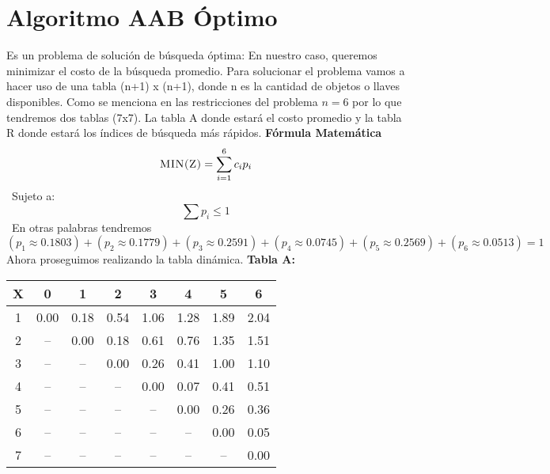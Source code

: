 \documentclass[10pt,letterpaper]{article}
\begin{document}
\section{Algoritmo AAB Óptimo} 
        Es un problema de solución de búsqueda óptima:  
        En nuestro caso, queremos minimizar el costo de la búsqueda promedio. 
        Para solucionar el problema vamos a hacer uso de una tabla (n+1) x (n+1), donde n es la cantidad 
        de objetos o llaves disponibles. 
        Como se menciona en las restricciones del problema $n = 6$ por lo que tendremos 
        dos tablas (7x7). La tabla A donde estará el costo promedio y la tabla R donde estará 
        los índices de búsqueda más rápidos. \newline \newline \newline 
        \textbf{\Large Fórmula Matemática} 
        \[ \textsc{\normalsize MIN(Z)}\\[0.5cm] = \sum_{i=1}^{6}c_{i}p_{i} \] 
        \ Sujeto a:  
        \[ \sum p_{i} \leq 1 \] 
        \ En otras palabras tendremos 
\[ (p_{1} \approx 0.1803)+(p_{2} \approx 0.1779)+(p_{3} \approx 0.2591)+(p_{4} \approx 0.0745)+(p_{5} \approx 0.2569)+(p_{6} \approx 0.0513) = 1 \]
\newline Ahora proseguimos realizando la tabla dinámica.
\newline \newline \newline \textbf{Tabla A: }
\begin{center}
\begin{tabu} to 1.0\textwidth { | c | c | c | c | c | c | c | c | }
\hline
{}\color{black}\textbf{X} & \color{black}\textbf{0} & \color{black}\textbf{1} & \color{black}\textbf{2} & \color{black}\textbf{3} & \color{black}\textbf{4} & \color{black}\textbf{5} & \color{black}\textbf{6} \\ 
\hline
{}\color{black}1 & 0.00 & 0.18 & 0.54 & 1.06 & 1.28 & 1.89 & 2.04 \\ 
\hline
{}\color{black}2 &  --  & 0.00 & 0.18 & 0.61 & 0.76 & 1.35 & 1.51 \\ 
\hline
{}\color{black}3 &  --  &  --  & 0.00 & 0.26 & 0.41 & 1.00 & 1.10 \\ 
\hline
{}\color{black}4 &  --  &  --  &  --  & 0.00 & 0.07 & 0.41 & 0.51 \\ 
\hline
{}\color{black}5 &  --  &  --  &  --  &  --  & 0.00 & 0.26 & 0.36 \\ 
\hline
{}\color{black}6 &  --  &  --  &  --  &  --  &  --  & 0.00 & 0.05 \\ 
\hline
{}\color{black}7 &  --  &  --  &  --  &  --  &  --  &  --  & 0.00 \\ 
\hline
\end{tabu} \\
\end{center}
\end{document}
